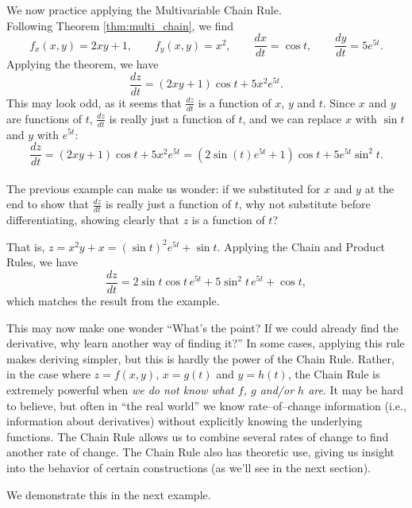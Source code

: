 We now practice applying the Multivariable Chain Rule.\\

{Following Theorem \ref{thm:multi_chain}, we find
$$f_x(x,y) = 2xy+1,\qquad f_y(x,y) = x^2,\qquad \frac{dx}{dt} = \cos t,\qquad \frac{dy}{dt}= 5e^{5t}.$$
Applying the theorem, we have
$$\frac{dz}{dt} = (2xy+1)\cos t+ 5x^2e^{5t}.$$
This may look odd, as it seems that $\frac{dz}{dt}$ is a function of $x$, $y$ and $t$. Since $x$ and $y$ are functions of $t$, $\frac{dz}{dt}$ is really just a function of $t$, and we can replace $x$ with $\sin t$ and $y$ with $e^{5t}$:
$$\frac{dz}{dt} = (2xy+1)\cos t+ 5x^2e^{5t} = (2\sin (t)e^{5t}+1)\cos t+5e^{5t}\sin^2t.$$
\baselineskip
}\\

The previous example can make us wonder: if we substituted for $x$ and $y$ at the end to show that $\frac{dz}{dt}$ is really just a function of $t$, why not substitute before differentiating, showing clearly that $z$ is a function of $t$?

That is, $z = x^2y+x = (\sin t)^2e^{5t}+\sin t.$ Applying the Chain and Product Rules, we have 
$$\frac{dz}{dt} = 2\sin t\cos t\, e^{5t}+ 5\sin^2t\,e^{5t}+\cos t,$$ which matches the result from the example.

This may now make one wonder ``What's the point? If we could already find the derivative, why learn another way of finding it?'' In some cases, applying this rule makes deriving simpler, but this is hardly the power of the Chain Rule. Rather, in the case where $z=f(x,y)$, $x=g(t)$ and $y=h(t)$, the Chain Rule is extremely powerful when \textit{we do not know what $f$, $g$ and/or $h$ are}. It may be hard to believe, but often in ``the real world'' we know rate--of--change information (i.e., information about derivatives) without explicitly knowing the underlying functions. The Chain Rule allows us to combine several rates of change to find another rate of change. The Chain Rule also has theoretic use, giving us insight into the behavior of certain constructions (as we'll see in the next section).

We demonstrate this in the next example.\\

